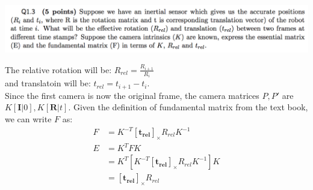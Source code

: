 \documentclass[12pt,letterpaper,boxed]{hmcpset}
\begin{document}
\begin{problem}[]
\includegraphics[width=\textwidth]{1_3.png}
\end{problem}
\begin{solution}
The relative rotation will be: $R_{rel} = \frac{R_{i+1}}{R_i}$\\
and translatoin will be: $t_{rel} = t_{i+1}-{t_i}$.\\

Since the first camera is now the original frame, the camera matrices $P, P'$ are $K[\mathbf{I}|0], K[\mathbf{R}|t]$. Given the definition of fundamental matrix from the text book, we can write $F$ as:
\begin{align*}
  F &= K^{-T}[\mathbf{t_{rel}}]_\times R_{rel}K^{-1}\\
  E &= K^{T}FK\\
    &= K^{T}[K^{-T}[\mathbf{t_{rel}}]_\times R_{rel}K^{-1}]K\\
    &= [\mathbf{t_{rel}}]_\times R_{rel}
\end{align*}
\end{solution}
\end{document}
